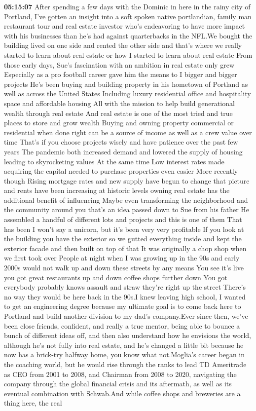 \documentclass{article}%
\begin{document}
\textbf{05:15:07}%
\newline%
After spending a few days with the Dominic in here in the rainy city of Portland, I've gotten an insight into a soft spoken native portlandian, family man restaurant tour and real estate investor who's endeavoring to have more impact with his businesses than he's had against quarterbacks in the NFL.We bought the building lived on one side and rented the other side and that's where we really started to learn about real estate or how I started to learn about real estate From those early days, Sue's fascination with an ambition in real estate only grew Especially as a pro football career gave him the means to I bigger and bigger projects He's been buying and building property in his hometown of Portland as well as across the United States Including luxury residential office and hospitality space and affordable housing All with the mission to help build generational wealth through real estate And real estate is one of the most tried and true places to store and grow wealth Buying and owning property commercial or residential when done right can be a source of income as well as a crew value over time That's if you choose projects wisely and have patience over the past few years The pandemic both increased demand and lowered the supply of housing leading to skyrocketing values At the same time Low interest rates made acquiring the capital needed to purchase properties even easier More recently though Rising mortgage rates and new supply have begun to change that picture and rents have been increasing at historic levels owning real estate has the additional benefit of influencing Maybe even transforming the neighborhood and the community around you that's an idea passed down to Sue from his father He assembled a handful of different lots and projects and this is one of them That has been I won't say a unicorn, but it's been very very profitable If you look at the building you have the exterior so we gutted everything inside and kept the exterior facade and then built on top of that It was originally a chop shop when we first took over People at night when I was growing up in the 90s and early 2000s would not walk up and down these streets by any means You see it's live you got great restaurants up and down coffee shops further down You got everybody probably knows assault and straw they're right up the street There's no way they would be here back in the 90s.I knew leaving high school, I wanted to get an engineering degree because my ultimate goal is to come back here to Portland and build another division to my dad's company.Ever since then, we've been close friends, confident, and really a true mentor, being able to bounce a bunch of different ideas off, and then also understand how he envisions the world, although he's not fully into real estate, and he's changed a little bit because he now has a brick{-}try halfway home, you know what not.Moglia's career began in the coaching world, but he would rise through the ranks to lead TD Ameritrade as CEO from 2001 to 2008, and Chairman from 2008 to 2020, navigating the company through the global financial crisis and its aftermath, as well as its eventual combination with Schwab.And while coffee shops and breweries are a thing here, the real 
\end{document}
